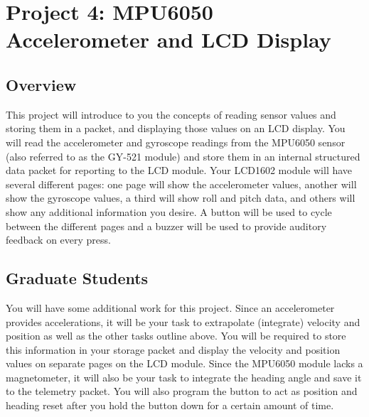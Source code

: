%

\chapter{Project 4: MPU6050 Accelerometer and LCD Display}

\section*{Overview} 
This project will introduce to you the concepts of reading sensor values and storing them in a packet, and displaying those values on an LCD display. 
You will read the accelerometer and gyroscope readings from the MPU6050 sensor (also referred to as the GY-521 module) and store them in an internal structured data packet for reporting to the LCD module.
Your LCD1602 module will have several different pages: one page will show the accelerometer values, another will show the gyroscope values, a third will show roll and pitch data, and others will show any additional information you desire.
A button will be used to cycle between the different pages and a buzzer will be used to provide auditory feedback on every press.

\section*{Graduate Students} 
You will have some additional work for this project. 
Since an accelerometer provides accelerations, it will be your task to extrapolate (integrate) velocity and position as well as the other tasks outline above.
You will be required to store this information in your storage packet and display the velocity and position values on separate pages on the LCD module.
Since the MPU6050 module lacks a magnetometer, it will also be your task to integrate the heading angle and save it to the telemetry packet.
You will also program the button to act as position and heading reset after you hold the button down for a certain amount of time.

